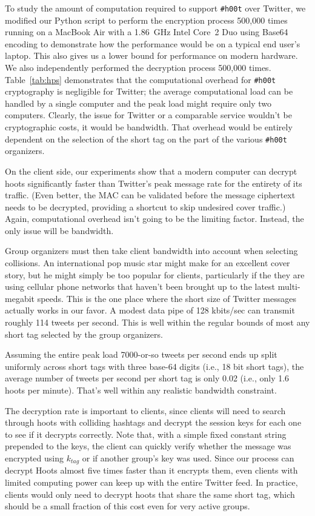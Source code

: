 \documentclass{sig-alternate-arxiv}
\newcommand{\hoot}{{\tt \#h00t}\xspace}
\newcommand{\msgs}{hoots\xspace}
\begin{document}
To study the amount of computation required to support \hoot over
Twitter, we modified our Python script to perform the encryption process
500,000 times running on a MacBook Air with a 1.86~GHz Intel Core~2 Duo
using Base64 encoding to demonstrate how the performance would be on a
typical end user's laptop. This also gives us a lower bound for
performance on modern hardware. We also independently performed the
decryption process 500,000 times.  Table~\ref{tab:hps} demonstrates that
the computational overhead for \hoot cryptography is negligible for
Twitter; the average computational load can be handled by a single
computer and the peak load might require only two computers. Clearly,
the issue for Twitter or a comparable service wouldn't be cryptographic
costs, it would be bandwidth. That overhead would be entirely dependent
on the selection of the short tag on the part of the various \hoot
organizers.

On the client side, our experiments show that a modern computer can
decrypt \msgs significantly faster than Twitter's peak message rate for
the entirety of its traffic. (Even better, the MAC can be validated
before the message ciphertext needs to be decrypted, providing a
shortcut to skip undesired cover traffic.)  Again, computational
overhead isn't going to be the limiting factor.  Instead, the only issue
will be bandwidth.

Group organizers must then take client bandwidth into account when
selecting collisions. An international pop music star might make for an
excellent cover story, but he might simply be too popular for clients,
particularly if the they are using cellular phone networks that haven't
been brought up to the latest multi-megabit speeds.  This is the one
place where the short size of Twitter messages actually works in our
favor. A modest data pipe of 128 kbits/sec can transmit roughly 114
tweets per second. This is well within the regular bounds of most any
short tag selected by the group organizers.

Assuming the entire peak load 7000-or-so tweets per second ends up split
uniformly across short tags with three base-64 digits (i.e., 18 bit
short tags), the average number of tweets per second per short tag is
only 0.02 (i.e., only 1.6 \msgs per minute). That's well within any
realistic bandwidth constraint.




The decryption rate is important to clients, since clients will need to
search through hoots with colliding hashtags and decrypt the session
keys for each one to see if it decrypts correctly. Note that, with a
simple fixed constant string prepended to the keys, the client can
quickly verify whether the message was encrypted using $k_{tag}$ or if
another group's key was used. Since our process can decrypt Hoots almost
five times faster than it encrypts them, even clients with limited
computing power can keep up with the entire Twitter feed. In practice,
clients would only need to decrypt hoots that share the same short tag,
which should be a small fraction of this cost even for very active
groups.
\end{document}
